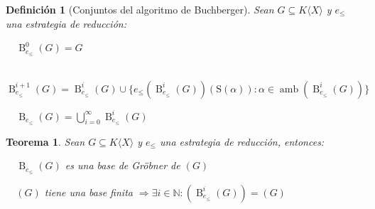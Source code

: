 \documentclass{amsbook}
\theoremstyle{customstyle}
\newtheorem{definition}{Definición}[section]
\newtheorem{theorem}{Teorema}[section]
\DeclareMathOperator{\amb}{amb}
\renewcommand{\S}{\text{S}}
\DeclareMathOperator{\B}{B}
\begin{document}

\begin{definition}[Conjuntos del algoritmo de Buchberger]
Sean $G ⊆ K⟨X⟩$ y $e_≤$ una estrategia de reducción:

  $\B_{e_≤}^0(G) = G$

  $\B_{e_≤}^{i + 1}(G) = \B_{e_≤}^i(G) ∪ \{e_≤(\B_{e_≤}^i(G))(\S(α)) : α ∈ \amb(\B_{e_≤}^i(G))\}$

  $\B_{e_≤}(G) = \bigcup_{i = 0}^∞ \B_{e_≤}^i(G)$

\end{definition}

\begin{theorem}
  Sean $G ⊆ K⟨X⟩$ y $e_≤$ una estrategia de reducción, entonces:

  $\B_{e_≤}(G)$ es una base de Gröbner de $(G)$

  $(G)$ tiene una base finita $⇒ ∃i ∈ ℕ : (\B_{e_≤}^i(G)) = (G)$
\end{theorem}



\end{document}
